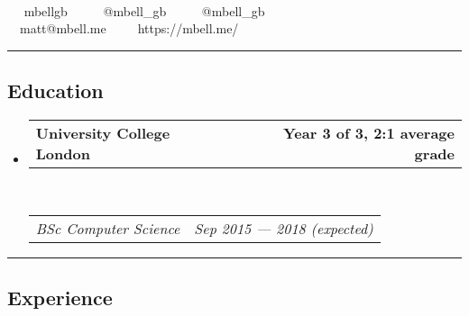 \documentclass[11pt,a4paper]{article}
\makeatletter
\newcommand{\headerrow}[2]
{\begin{tabular*}{\linewidth}{l@{\extracolsep{\fill}}r}
	#1 &
	#2 \\
\end{tabular*}}
\makeatother
\begin{document}
\begin{center}
{\Huge {}}\\


\ \  mbellgb\ \ \textbullet\
\ \  @mbell\_gb\ \ \textbullet\
\ \  @mbell\_gb\ \ \textbullet\
\\
\ \ matt@mbell.me\ \ \textbullet\
\ \ https://mbell.me/
\end{center}


\hrule
\vspace{-1.2em}
\subsection*{Education}

\begin{itemize}
	\parskip=0.1em

	\item
	\headerrow%
		{\textbf{University College London}}
		{\textbf{Year 3 of 3, 2:1 average grade}}\\
	\headerrow%
		{\emph{BSc Computer Science}}
		{\emph{Sep 2015 --- 2018 (expected)}}


\end{itemize}


 \vspace{-0.4em}
 \hrule
 \vspace{-1.2em}
 \subsection*{Experience}
\end{document}
